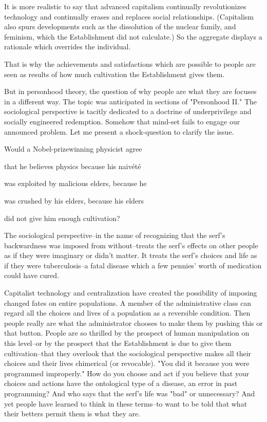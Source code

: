 \begin{enumerate}[label=\alph*.]
It is more realistic to say that advanced capitalism continually revolutionizes technology and continually erases and replaces social relationships. (Capitalism also spurs developments such as the dissolution of the nuclear family, and feminism, which the Establishment did not calculate.) So the aggregate displays a rationale which overrides the individual.

That is why the achievements and satisfactions which are possible to people are seen as results of how much cultivation the Establishment gives them.

But in personhood theory, the question of why people are what they are focuses in a different way. The topic was anticipated in sections of "Personhood II." The sociological perspective is tacitly dedicated to a doctrine of underprivilege and socially engineered redemption. Somehow that mind-set fails to engage our announced problem. Let me present a shock-question to clarify the issue.

Would a Nobel-prizewinning physicist agree

that he believes physics because his naivété

was exploited by malicious elders, because he

was crushed by his elders, because his elders

did not give him enough cultivation?	

The sociological perspective–in the name of recognizing that the serf's backwardness was imposed from without–treats the serf's effects on other people as if they were imaginary or didn't matter. It treats the serf's choices and life as if they were tuberculosis–a fatal disease which a few pennies' worth of medication could have cured.

Capitalist technology and centralization have created the possibility of imposing changed fates on entire populations. A member of the administrative class can regard all the choices and lives of a population as a reversible condition. Then people really are what the administrator chooses to make them by pushing this or that button. People are so thrilled by the prospect of human manipulation on this level–or by the prospect that the Establishment is due to give them cultivation–that they overlook that the sociological perspective makes all their choices and their lives chimerical (or revocable). "You did it because you were programmed improperly." How do you choose and act if you believe that your choices and actions have the ontological type of a disease, an error in past programming? And who says that the serf's life was "bad" or unnecessary? And yet people have learned to think in these terms–to want to be told that what their betters permit them is what they are.


\end{enumerate}
